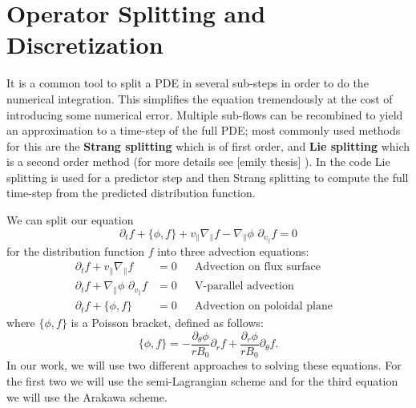 
\section{Operator Splitting and Discretization}
\label{sec:splitting_discretization}

It is a common tool to split a PDE in several sub-steps in order to do the numerical integration. This simplifies the equation tremendously at the cost of introducing some numerical error. Multiple sub-flows can be recombined to yield an approximation to a time-step of the full PDE; most commonly used methods for this are the \textbf{Strang splitting} which is of first order, and \textbf{Lie splitting} which is a second order method (for more details see [emily thesis] %
). In the code \cite{pygyro_code} Lie splitting is used for a predictor step and then Strang splitting to compute the full time-step from the predicted distribution function.

We can split our equation 
\begin{equation}
 \partial_t f + \{\phi, f \} + v_\parallel \nabla_\parallel f - \nabla_\parallel \phi\,\, \partial_{v_\parallel} f = 0
\end{equation}
for the distribution function $f$ into three advection equations:
\begin{subequations}
	\begin{align}
		\partial_t f + v_\parallel \nabla_\parallel f & = 0 && \text{Advection on flux surface} & \\
		\partial_t f + \nabla_\parallel \phi\,\, \partial_{v_{\parallel}} f & = 0 && \text{V-parallel advection} & \\
		\partial_t f + \{\phi, f\} & = 0 && \text{Advection on poloidal plane} &
	\end{align}
\end{subequations}
where $\{\phi,f\}$ is a Poisson bracket, defined as follows:
\begin{equation}
 \{\phi,f\}=-\frac{\partial_\theta\phi}{rB_0}\partial_r f + \frac{\partial_r\phi}{rB_0}\partial_\theta f.
\end{equation}
In our work, we will use two different approaches to solving these equations. For the first two we will use the semi-Lagrangian scheme and for the third equation we will use the Arakawa scheme.







